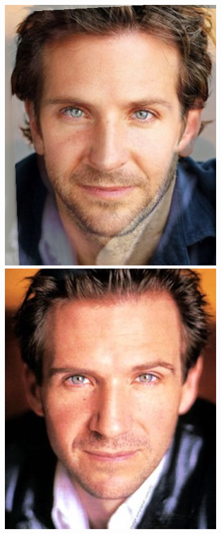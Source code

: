 \documentclass[conference]{IEEEtran}
\begin{document}
\begin{figure}[H]
\begin{multicols}{3}
    \includegraphics[width=1.0\linewidth]{results/faces/B/img20.png} \par
    \includegraphics[width=1.0\linewidth]{results/faces/B/img50.png} \par

\end{multicols}
\end{figure}
\end{document}
